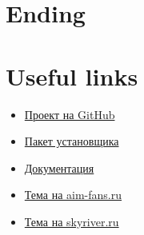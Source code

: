 \documentclass[a4paper,12pt]{report}
\begin{document}
\chapter*{Ending}

\chapter*{Useful links}

\begin{itemize}
\item \href{https://github.com/aimrebirth}{Проект на GitHub}
\item \href{https://www.dropbox.com/s/0zhbgb1ftspcv9w/polygon4.zip?dl=1}{Пакет установщика}
\item \href{https://www.dropbox.com/s/ipnakg5civ0xp0g/Polygon4_ru.pdf?dl=1}{Документация}
\item \href{http://aim-fans.ru/index.php?showtopic=147}{Тема на aim-fans.ru}
\item \href{http://forum.skyriver.ru/viewtopic.php?f=26&t=4801}{Тема на skyriver.ru}
\end{itemize}
\end{document}
